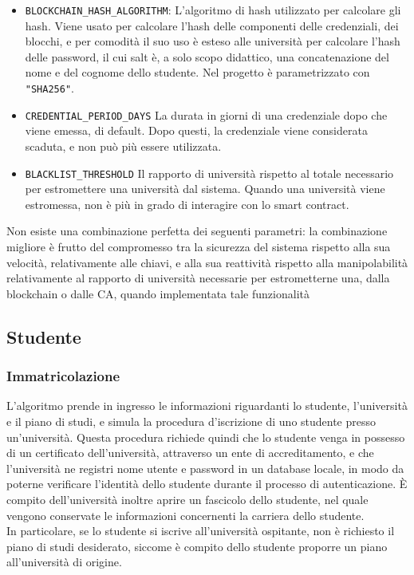 \documentclass[a4paper,12pt]{article}
\begin{document}
\begin{itemize}
    \item \texttt{BLOCKCHAIN\_HASH\_ALGORITHM}: L'algoritmo di hash utilizzato per calcolare gli hash. Viene usato per calcolare l'hash delle componenti delle credenziali, dei blocchi, e per comodità il suo uso è esteso alle università per calcolare l'hash delle password, il cui salt è, a solo scopo didattico, una concatenazione del nome e del cognome dello studente. Nel progetto è parametrizzato con \texttt{"SHA256"}.
    \item \texttt{CREDENTIAL\_PERIOD\_DAYS} La durata in giorni di una credenziale dopo che viene emessa, di default. Dopo questi, la credenziale viene considerata scaduta, e non può più essere utilizzata.
    \item \texttt{BLACKLIST\_THRESHOLD} Il rapporto di università rispetto al totale necessario per estromettere una università dal sistema. Quando una università viene estromessa, non è più in grado di interagire con lo smart contract. 
\end{itemize}
Non esiste una combinazione perfetta dei seguenti parametri: la combinazione migliore è frutto del compromesso tra la sicurezza del sistema rispetto alla sua velocità, relativamente alle chiavi, e alla sua reattività rispetto alla manipolabilità relativamente al rapporto di università necessarie per estrometterne una, dalla blockchain o dalle CA, quando implementata tale funzionalità
\subsection{Studente}
\subsubsection{Immatricolazione}
L'algoritmo prende in ingresso le informazioni riguardanti lo studente, l'università e il piano di studi, e simula la procedura d'iscrizione di uno studente presso un'università. Questa procedura richiede quindi che lo studente venga in possesso di un certificato dell'università, attraverso un ente di accreditamento, e che l'università ne registri nome utente e password in un database locale, in modo da poterne verificare l'identità dello studente durante il processo di autenticazione. È compito dell'università inoltre aprire un fascicolo dello studente, nel quale vengono conservate le informazioni concernenti la carriera dello studente.
\\[1em]
In particolare, se lo studente si iscrive all'università ospitante, non è richiesto il piano di studi desiderato, siccome è compito dello studente proporre un piano all'università di origine.
\end{document}
